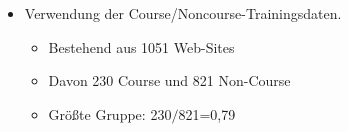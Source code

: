 \begin{frame}[c]
\begin{itemize}
  \item Verwendung der Course/Noncourse-Trainingsdaten.
  \begin{itemize}
  \item Bestehend aus 1051 Web-Sites
  \item Davon 230 Course und 821 Non-Course
  \item Größte Gruppe: 230$/$821=0,79
\end{itemize}
\end{itemize}
\end{frame}

